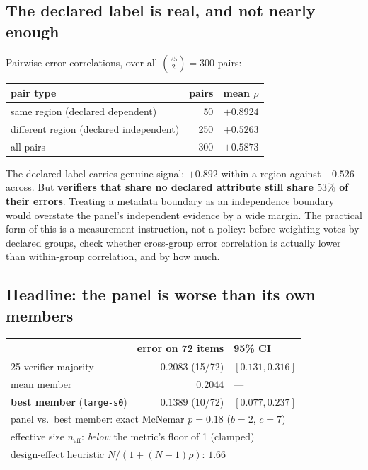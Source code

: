 \documentclass[11pt,a4paper]{article}
\newcommand{\neff}{n_{\mathrm{eff}}}
\newcommand{\code}[1]{\texttt{#1}}
\begin{document}
\subsection{The declared label is real, and not nearly enough}

Pairwise error correlations, over all $\binom{25}{2} = 300$ pairs:

\begin{center}
\begin{tabular}{lrr}
\toprule
pair type & pairs & mean $\rho$ \\
\midrule
same region (declared dependent)   & 50  & $+0.8924$ \\
different region (declared independent) & 250 & $+0.5263$ \\
\midrule
all pairs & 300 & $+0.5873$ \\
\bottomrule
\end{tabular}
\end{center}

The declared label carries genuine signal: $+0.892$ within a region against
$+0.526$ across. But \textbf{verifiers that share no declared attribute still
share $53\%$ of their errors}. Treating a metadata boundary as an independence
boundary would overstate the panel's independent evidence by a wide margin. The
practical form of this is a measurement instruction, not a policy: before
weighting votes by declared groups, check whether cross-group error correlation
is actually lower than within-group correlation, and by how much.

\subsection{Headline: the panel is worse than its own members}

\begin{center}
\begin{tabular}{lrl}
\toprule
& error on 72 items & 95\% CI \\
\midrule
25-verifier majority              & $0.2083$ \;(15/72) & $[0.131, 0.316]$ \\
mean member                       & $0.2044$           & --- \\
\textbf{best member} (\code{large-s0}) & $\mathbf{0.1389}$ \;(10/72) & $[0.077, 0.237]$ \\
\midrule
\multicolumn{3}{l}{panel vs.\ best member: exact McNemar $p = 0.18$ \;($b=2$, $c=7$)} \\
\multicolumn{3}{l}{effective size $\neff$: \emph{below} the metric's floor of 1 (clamped)} \\
\multicolumn{3}{l}{design-effect heuristic $N/(1+(N-1)\rho)$: $1.66$} \\
\bottomrule
\end{tabular}
\end{center}
\end{document}
